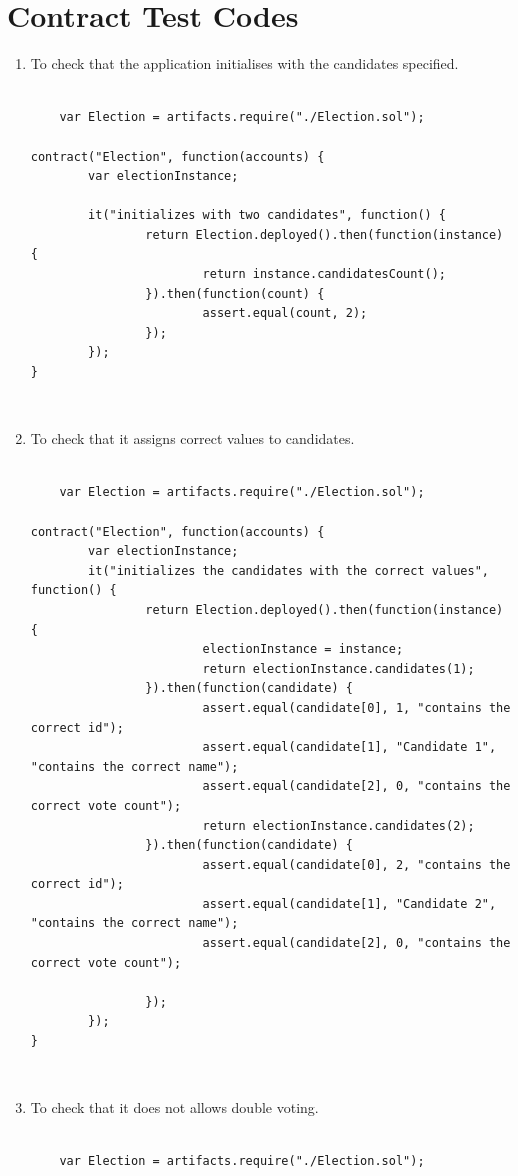 \documentclass{report}
\begin{document}
\chapter{Contract Test Codes}
\begin{enumerate}
    \item To check that the application initialises with the candidates specified.\\
    \\
    \begin{verbatim}
    var Election = artifacts.require("./Election.sol");

contract("Election", function(accounts) {
        var electionInstance;

        it("initializes with two candidates", function() {
                return Election.deployed().then(function(instance) {
                        return instance.candidatesCount();
                }).then(function(count) {
                        assert.equal(count, 2);
                });
        });  
}
    \end{verbatim}
\\
    \item To check that it assigns correct values to candidates.\\
    \\
    \begin{verbatim}
    var Election = artifacts.require("./Election.sol");

contract("Election", function(accounts) {
        var electionInstance;
        it("initializes the candidates with the correct values", function() {
                return Election.deployed().then(function(instance) {
                        electionInstance = instance;
                        return electionInstance.candidates(1);
                }).then(function(candidate) {
                        assert.equal(candidate[0], 1, "contains the correct id");
                        assert.equal(candidate[1], "Candidate 1", "contains the correct name");
                        assert.equal(candidate[2], 0, "contains the correct vote count");
                        return electionInstance.candidates(2);
                }).then(function(candidate) {
                        assert.equal(candidate[0], 2, "contains the correct id");
                        assert.equal(candidate[1], "Candidate 2", "contains the correct name");
                        assert.equal(candidate[2], 0, "contains the correct vote count");

                });
        });
}        
    \end{verbatim}
\\
    \item To check that it does not allows double voting.\\
    \\
   \begin{verbatim}
    var Election = artifacts.require("./Election.sol");


\end{verbatim}
\end{enumerate}
\end{document}
